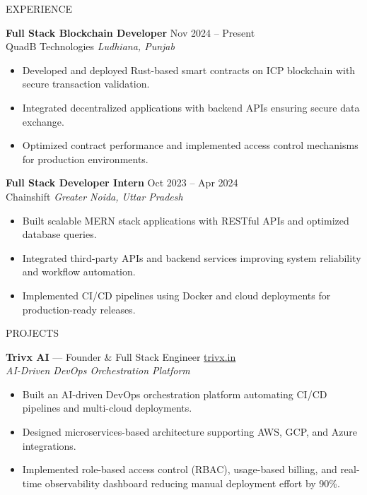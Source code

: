 \documentclass{resume}
\begin{document}
\begin{rSection}{EXPERIENCE}

\textbf{Full Stack Blockchain Developer} \hfill Nov 2024 -- Present \\
QuadB Technologies \hfill \textit{Ludhiana, Punjab}
\begin{itemize}
    \item Developed and deployed Rust-based smart contracts on ICP blockchain with secure transaction validation.
    \item Integrated decentralized applications with backend APIs ensuring secure data exchange.
    \item Optimized contract performance and implemented access control mechanisms for production environments.
\end{itemize}

\textbf{Full Stack Developer Intern} \hfill Oct 2023 -- Apr 2024 \\
Chainshift \hfill \textit{Greater Noida, Uttar Pradesh}
\begin{itemize}
    \item Built scalable MERN stack applications with RESTful APIs and optimized database queries.
    \item Integrated third-party APIs and backend services improving system reliability and workflow automation.
    \item Implemented CI/CD pipelines using Docker and cloud deployments for production-ready releases.
\end{itemize}

\end{rSection}


\begin{rSection}{PROJECTS}

\textbf{Trivx AI} — Founder \& Full Stack Engineer \hfill \href{https://trivx.in}{trivx.in} \\
\textit{AI-Driven DevOps Orchestration Platform}
\begin{itemize}
    \item Built an AI-driven DevOps orchestration platform automating CI/CD pipelines and multi-cloud deployments.
    \item Designed microservices-based architecture supporting AWS, GCP, and Azure integrations.
    \item Implemented role-based access control (RBAC), usage-based billing, and real-time observability dashboard reducing manual deployment effort by 90\%.
\end{itemize}

\end{rSection}
\end{document}
